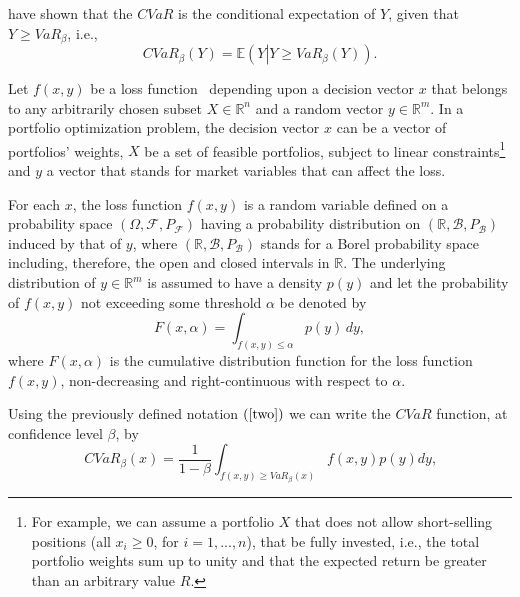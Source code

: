 \documentclass[a4paper,12pt]{report}
\begin{document}
\begin{refsection}
\bigskip \citet*{uryasev1999} have shown that the $CVaR$ is the conditional
expectation of $Y$, given that $Y\geq VaR_{\beta }$, i.e.,
\begin{equation}
CVaR_{\beta }\left( Y\right) =\mathbb{E}\left( Y\left\vert Y\geq VaR_{\beta
}\left( Y\right) \right. \right) .  \label{three}
\end{equation}

Let $f\left( x,y\right) $ be a loss function \ depending upon a decision
vector $x$ that belongs to any arbitrarily chosen subset $X\in
\mathbb{R}
^{n}$ and a random vector $y\in
\mathbb{R}
^{m}$. In a portfolio optimization problem, the decision vector $x$ can be a
vector of portfolios' weights, $X$ be a set of feasible portfolios,
subject to linear constraints\footnote{%
	For example, we can assume a portfolio $X$ that does not allow short-selling positions (all $x_{i}\geq 0$, for $i=1,...,n$),
	that be fully invested, i.e., the total portfolio weights sum
	up to unity and that the expected return be greater than an arbitrary value $%
	R$.} and $y$ a vector that stands for market variables that can affect the loss.

\bigskip

For each $x$, the loss function $f\left( x,y\right) $ is a random variable
defined on a probability space $\left( \Omega ,\mathcal{F},P_{\mathcal{F}%
}\right) $ having a probability distribution on $\left(
\mathbb{R}
,\mathcal{B},P_{\mathcal{B}}\right) $ induced by that of $y$, where $\left(
\mathbb{R}
,\mathcal{B},P_{\mathcal{B}}\right) $ stands for a Borel probability space
including, therefore, the open and closed intervals in $%
\mathbb{R}
$. The underlying distribution of $y\in
\mathbb{R}
^{m}$ is assumed to have a density $p(y)$ and let the probability of $f\left( x,y\right) $ not exceeding some threshold $\alpha$ be denoted by
\begin{equation}
F(x,\alpha)=\int_{f(x,y)\leq \alpha}p(y)\,dy,  \label{four}
\end{equation}
where $F(x,\alpha)$ is the cumulative distribution function for the loss function $f\left( x,y\right) $, non-decreasing and right-continuous with respect to $\alpha$.

Using the previously defined notation $\left( \ref{two}\right) $ we can
write the $CVaR$ function, at confidence level $\beta $, by%
\begin{equation}
CVaR_{\beta }\left( x\right) = \frac{1}{1-\beta }\int_{f(x,y)\geq VaR_{\beta
	}\left( x\right) }f(x,y)p(y)dy\text{,}  \label{five}
\end{equation}


\end{refsection}
\end{document}
